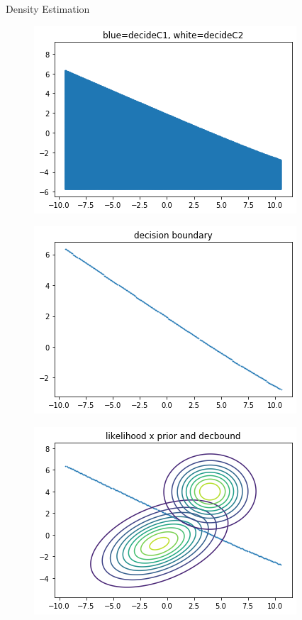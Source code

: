 \documentclass[
ngerman,
]{tudaexercise}
\begin{document}
\begin{task}{Density Estimation}
\begin{subtask}
\begin{figure}[H]
\end{figure}
\begin{figure}[H]
	\includegraphics{dec1.png}
\end{figure}
\begin{figure}[H]
	\includegraphics{dec2.png}
\end{figure}
\begin{figure}[H]
	\includegraphics{dec3.png}
\end{figure}
	\end{subtask}
	\end{task}
	
\end{document}
